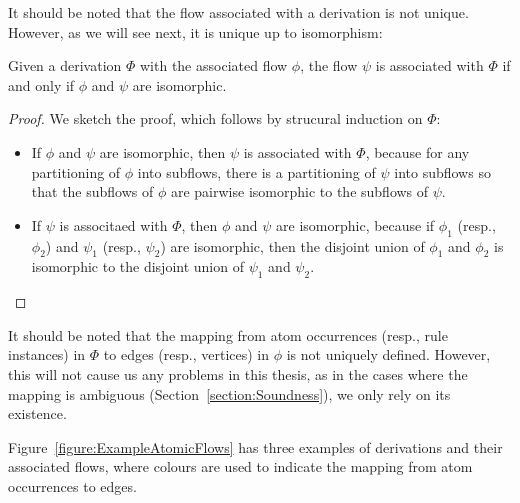 It should be noted that the flow associated with a derivation is not unique. However, as we will see next, it is unique up to isomorphism:

\begin{proposition}\label{proposition:FlowUnique}
Given a derivation $\Phi$ with the associated flow $\phi$, the flow $\psi$ is associated with $\Phi$ if and only if $\phi$ and $\psi$ are isomorphic.
\end{proposition}

\begin{proof}
We sketch the proof, which follows by strucural induction on $\Phi$:
\begin{itemize}
  \item If $\phi$ and $\psi$ are isomorphic, then $\psi$ is associated with $\Phi$, because for any partitioning of $\phi$ into subflows, there is a partitioning of $\psi$ into subflows so that the subflows of $\phi$ are pairwise isomorphic to the subflows of $\psi$.
  \item If $\psi$ is associtaed with $\Phi$, then $\phi$ and $\psi$ are isomorphic, because if $\phi_1$ (resp., $\phi_2$) and $\psi_1$ (resp., $\psi_2$) are isomorphic, then the disjoint union of $\phi_1$ and $\phi_2$ is isomorphic to the disjoint union of $\psi_1$ and $\psi_2$.
\end{itemize}
\end{proof}


\begin{remark}\label{remark:AmbiguousMapping}
It should be noted that the mapping from atom occurrences (resp., rule instances) in $\Phi$ to edges (resp., vertices) in $\phi$ is not uniquely defined. However, this will not cause us any problems in this thesis, as in the cases where the mapping is ambiguous (Section~\ref{section:Soundness}), we only rely on its existence.
\end{remark}

\begin{example}
Figure~\vref{figure:ExampleAtomicFlows} has three examples of derivations and their associated flows, where colours are used to indicate the mapping from atom occurrences to edges.
\end{example}

